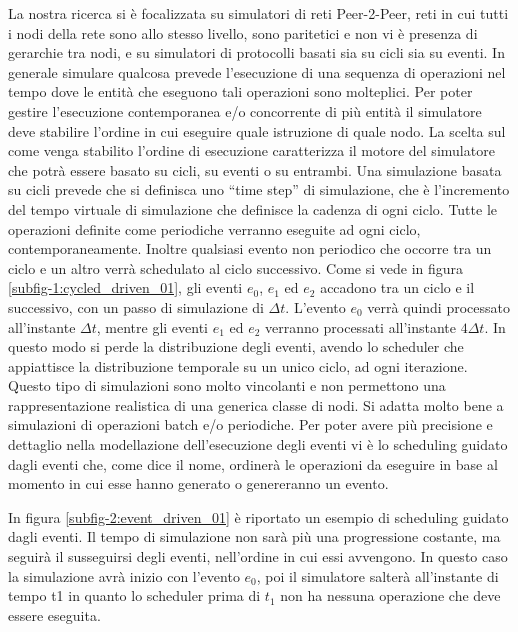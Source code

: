 La nostra ricerca si è focalizzata su simulatori di reti Peer-2-Peer, reti in cui tutti i nodi della rete sono allo stesso livello, sono paritetici e non vi è presenza di gerarchie tra nodi, e su simulatori di protocolli basati sia su cicli sia su eventi. In generale simulare qualcosa prevede l'esecuzione di una sequenza di operazioni nel tempo dove le entità che eseguono tali operazioni sono molteplici. Per poter gestire l'esecuzione contemporanea e/o concorrente di più entità il simulatore deve stabilire l'ordine in cui eseguire quale istruzione di quale nodo. La scelta sul come venga stabilito l'ordine di esecuzione caratterizza il motore del simulatore che potrà essere basato su cicli, su eventi o su entrambi. Una simulazione basata su cicli prevede che si definisca uno “time step” di simulazione, che è l'incremento del tempo virtuale di simulazione che definisce la cadenza di ogni ciclo. Tutte le operazioni definite come periodiche verranno eseguite ad ogni ciclo, contemporaneamente. Inoltre qualsiasi evento non periodico che occorre tra un ciclo e un altro verrà schedulato al ciclo successivo. Come si vede in figura \ref{subfig-1:cycled_driven_01}, gli eventi $e_0$, $e_1$ ed $e_2$ accadono tra un ciclo e il successivo, con un passo di simulazione di $\Delta t$. L'evento $e_0$ verrà quindi processato all'instante $\Delta t$, mentre gli eventi $e_1$ ed $e_2$ verranno processati all'instante $4\Delta t$. In questo modo si perde la distribuzione degli eventi, avendo lo scheduler che appiattisce la distribuzione temporale su un unico ciclo, ad ogni iterazione. Questo tipo di simulazioni sono molto vincolanti e non permettono una rappresentazione realistica di una generica classe di nodi. Si adatta molto bene a simulazioni di operazioni batch e/o periodiche. Per poter avere più precisione e dettaglio nella modellazione dell'esecuzione degli eventi vi è lo scheduling guidato dagli eventi che, come dice il nome, ordinerà le operazioni da eseguire in base al momento in cui esse hanno generato o genereranno un evento.

In figura \ref{subfig-2:event_driven_01} è riportato un esempio di scheduling guidato dagli eventi. Il tempo di simulazione non sarà più una progressione costante, ma seguirà il susseguirsi degli eventi, nell'ordine in cui essi avvengono. In questo caso la simulazione avrà inizio con l'evento $e_0$, poi il simulatore salterà all'instante di tempo t1 in quanto lo scheduler prima di $t_1$ non ha nessuna operazione che deve essere eseguita.

%

